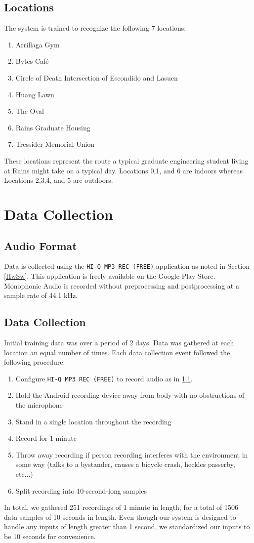 \documentclass[journal]{IEEEtran}
\begin{document}
\subsection{Locations}
The system is trained to recognize the following 7 locations:
\begin{enumerate}[label=\arabic*.]
\addtocounter{enumi}{-1}
\item Arrillaga Gym
\item Bytes Caf\'e
\item Circle of Death
    \subitem Intersection of Escondido and Lasuen
\item Huang Lawn
\item The Oval
\item Rains Graduate Housing
\item Tressider Memorial Union
\end{enumerate}
These locations represent the route a typical graduate engineering student living at Rains might take on a typical day. Locations 0,1, and 6 are indoors whereas Locations 2,3,4, and 5 are outdoors.


\section{Data Collection}\label{Data}
\subsection{Audio Format}\label{AudioFormat}
Data is collected using the \texttt{HI-Q MP3 REC (FREE)} application as noted in Section \ref{HwSw}. This application is freely available on the Google Play Store. Monophonic Audio is recorded without preprocessing and postprocessing at a sample rate of 44.1 kHz.
\subsection{Data Collection}
Initial training data was over a period of 2 days. Data was gathered at each location an equal number of times. Each data collection event followed the following procedure:
\begin{enumerate}
\item Configure \texttt{HI-Q MP3 REC (FREE)} to record audio as in \ref{AudioFormat}.
\item Hold the Android recording device away from body with no obstructions of the microphone
\item Stand in a single location throughout the recording
\item Record for 1 minute
\item Throw away recording if person recording interferes with the environment in some way (talks to a bystander, causes a bicycle crash, heckles passerby, etc...) 
\item Split recording into 10-second-long samples
\end{enumerate}
In total, we gathered 251 recordings of 1 minute in length, for a total of 1506 data samples of 10 seconds in length. Even though our system is designed to handle any inputs of length greater than 1 second, we standardized our inputs to be 10 seconds for convenience. 
\end{document}
